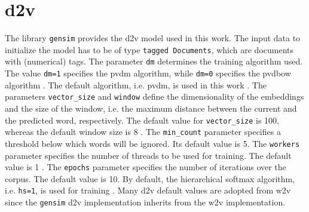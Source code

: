 \section{\ac{d2v}}\label{sec:impl-doc2vec}

The library \texttt{gensim} provides the \ac{d2v} model used in this work.
The input data to initialize the model has to be of type \texttt{tagged Documents}, which are documents with (numerical) tags.
The parameter \texttt{dm} determines the training algorithm used.
The value \texttt{dm=1} specifies the \ac{pvdm} algorithm, while \texttt{dm=0} specifies the \ac{pvdbow} algorithm \cite{gensim-doc2vec}.
The default algorithm, i.e. \ac{pvdm}, is used in this work \cite{gensim-word2vec-init}.
The parameters \texttt{vector\_size} and \texttt{window} define the dimensionality of the embeddings and the size of the window, 
i.e. the maximum distance between the current and the predicted word, respectively.
The default value for \texttt{vector\_size} is 100, whereas the default window size is 8 \cite{gensim-word2vec-init, gensim-doc2vec-init}.
The \texttt{min\_count} parameter specifies a threshold below which words will be ignored.
Its default value is 5.
The \texttt{workers} parameter specifies the number of threads to be used for training.
The default value is 1 \cite{gensim-word2vec-init}.
The \texttt{epochs} parameter specifies the number of iterations over the corpus.
The default value is 10.
By default, the hierarchical softmax algorithm, i.e. \texttt{hs=1}, is used for training \cite{gensim-doc2vec}.
Many \ac{d2v} default values are adopted from \ac{w2v} since the \texttt{gensim} \ac{d2v} implementation inherits from the \ac{w2v} implementation.
